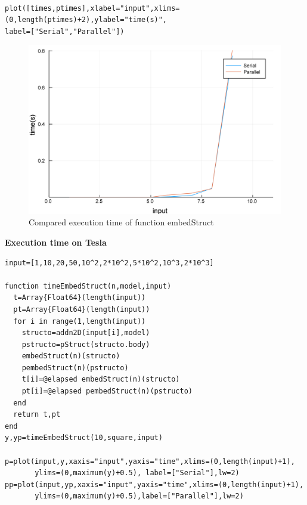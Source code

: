 \documentclass[a4paper,12pt]{article}
\begin{document}
\noindent{}
\begin{Verbatim}[fontsize=\footnotesize]

plot([times,ptimes],xlabel="input",xlims=(0,length(ptimes)+2),ylabel="time(s)",
label=["Serial","Parallel"])

\end{Verbatim}

\begin{figure}[!h]
	\centering
	\includegraphics[scale=0.08]{embedStructC.png}
	\caption{Compared execution time of function embedStruct}
\end{figure}
\newpage

\textbf{Execution time on Tesla}
\begin{Verbatim}[fontsize=\footnotesize]
input=[1,10,20,50,10^2,2*10^2,5*10^2,10^3,2*10^3]

function timeEmbedStruct(n,model,input)
  t=Array{Float64}(length(input))
  pt=Array{Float64}(length(input))
  for i in range(1,length(input))
    structo=addn2D(input[i],model)
    pstructo=pStruct(structo.body)
    embedStruct(n)(structo)
    pembedStruct(n)(pstructo)
    t[i]=@elapsed embedStruct(n)(structo)
    pt[i]=@elapsed pembedStruct(n)(pstructo)
  end
  return t,pt
end
y,yp=timeEmbedStruct(10,square,input)

p=plot(input,y,xaxis="input",yaxis="time",xlims=(0,length(input)+1),
       ylims=(0,maximum(y)+0.5), label=["Serial"],lw=2)       
pp=plot(input,yp,xaxis="input",yaxis="time",xlims=(0,length(input)+1),
       ylims=(0,maximum(y)+0.5),label=["Parallel"],lw=2)
\end{Verbatim}
\vspace{25px}
\end{document}
